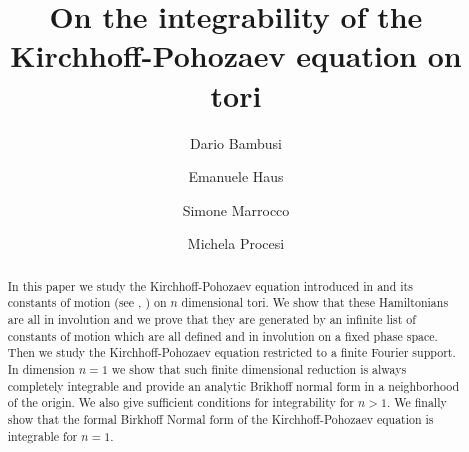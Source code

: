 \documentclass[reqno,11pt]{amsart}
\title{On the integrability of the  Kirchhoff-Pohozaev equation on tori}
\author{Dario Bambusi}
\author{Emanuele Haus}
\author{Simone Marrocco}
\author{Michela Procesi}
\theoremstyle{plain}
\numberwithin{equation}{section}
\newcommand{\cI}{{\mathcal I}}
\begin{document}
\maketitle
\begin{abstract}
In this paper we study the Kirchhoff-Pohozaev equation introduced in \cite{P2} and its constants of motion (see \cite{BoitiManfrin2025}, \cite{BoitiManfrin2026}) on $n$ dimensional tori. We show that these Hamiltonians are all in involution and we prove that they are generated by an infinite list of constants of motion which are all defined and in involution on a fixed phase space.  Then we study the Kirchhoff-Pohozaev equation restricted to a finite Fourier support. In dimension $n=1$ we show that such finite dimensional reduction is always completely integrable and provide an analytic Brikhoff normal form in a neighborhood of the origin. We also give sufficient conditions for integrability for $n>1$. We finally show that the formal Birkhoff Normal form of the Kirchhoff-Pohozaev equation is integrable for $n=1$.%
\end{abstract}
	\tableofcontents 
\end{document}
